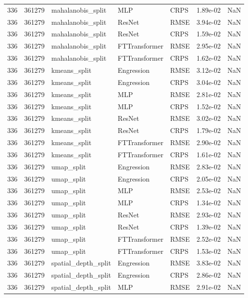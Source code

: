 \begin{tabular}{rrlllrr}
336 & 361279 & mahalanobis\_split & MLP & CRPS & 1.89e-02 & NaN \\
336 & 361279 & mahalanobis\_split & ResNet & RMSE & 3.94e-02 & NaN \\
336 & 361279 & mahalanobis\_split & ResNet & CRPS & 1.59e-02 & NaN \\
336 & 361279 & mahalanobis\_split & FTTransformer & RMSE & 2.95e-02 & NaN \\
336 & 361279 & mahalanobis\_split & FTTransformer & CRPS & 1.62e-02 & NaN \\
336 & 361279 & kmeans\_split & Engression & RMSE & 3.12e-02 & NaN \\
336 & 361279 & kmeans\_split & Engression & CRPS & 3.04e-02 & NaN \\
336 & 361279 & kmeans\_split & MLP & RMSE & 2.81e-02 & NaN \\
336 & 361279 & kmeans\_split & MLP & CRPS & 1.52e-02 & NaN \\
336 & 361279 & kmeans\_split & ResNet & RMSE & 3.02e-02 & NaN \\
336 & 361279 & kmeans\_split & ResNet & CRPS & 1.79e-02 & NaN \\
336 & 361279 & kmeans\_split & FTTransformer & RMSE & 2.90e-02 & NaN \\
336 & 361279 & kmeans\_split & FTTransformer & CRPS & 1.61e-02 & NaN \\
336 & 361279 & umap\_split & Engression & RMSE & 2.83e-02 & NaN \\
336 & 361279 & umap\_split & Engression & CRPS & 2.05e-02 & NaN \\
336 & 361279 & umap\_split & MLP & RMSE & 2.53e-02 & NaN \\
336 & 361279 & umap\_split & MLP & CRPS & 1.34e-02 & NaN \\
336 & 361279 & umap\_split & ResNet & RMSE & 2.93e-02 & NaN \\
336 & 361279 & umap\_split & ResNet & CRPS & 1.39e-02 & NaN \\
336 & 361279 & umap\_split & FTTransformer & RMSE & 2.52e-02 & NaN \\
336 & 361279 & umap\_split & FTTransformer & CRPS & 1.53e-02 & NaN \\
336 & 361279 & spatial\_depth\_split & Engression & RMSE & 3.83e-02 & NaN \\
336 & 361279 & spatial\_depth\_split & Engression & CRPS & 2.86e-02 & NaN \\
336 & 361279 & spatial\_depth\_split & MLP & RMSE & 2.91e-02 & NaN \\

\end{tabular}
